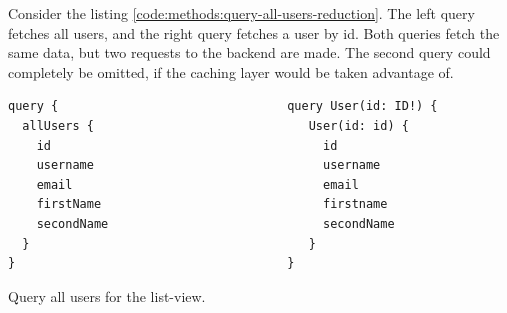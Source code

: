 \documentclass[MSE,Master,english]{twbook}%
\begin{document}
Consider the listing \ref{code:methods:query-all-users-reduction}. The left query fetches all users, and the right query fetches a user by id. Both queries fetch the same data, but two requests to the backend are made. The second query could completely be omitted, if the caching layer would be taken advantage of.


\ifshowListings
\begin{listing}[H]
\begin{verbatim}
query {                                query User(id: ID!) {
  allUsers {                              User(id: id) {
    id                                      id
    username                                username
    email                                   email
    firstName                               firstname
    secondName                              secondName
  }                                       }    
}                                      }
\end{verbatim}
\caption{Query all users for the list-view.}\label{code:methods:query-all-users-reduction}
\end{listing}
\fi

\ifshowUnusedContent

\end{document}
